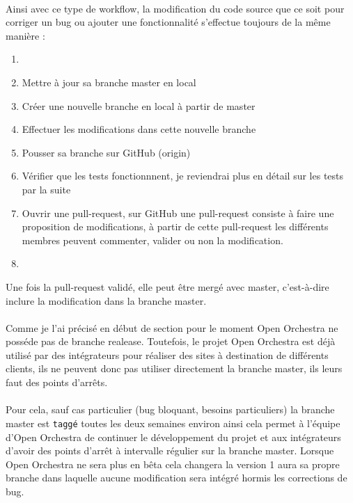 \paragraph{}
Ainsi avec ce type de workflow, la modification du code source que ce soit pour corriger un bug ou ajouter une fonctionnalité s'effectue toujours de la même manière : 
\begin{enumerate}
\item[]
\item Mettre à jour sa branche master en local
\item Créer une nouvelle branche en local à partir de master
\item Effectuer les modifications dans cette nouvelle branche
\item Pousser sa branche sur GitHub (origin)
\item Vérifier que les tests fonctionnnent, je reviendrai plus en détail sur les tests par la suite
\item Ouvrir une pull-request, sur GitHub une pull-request consiste à faire une proposition de modifications, à partir de cette pull-request les différents membres peuvent commenter, valider ou non la modification.
         \item[]
\end{enumerate}

Une fois la pull-request validé, elle peut être mergé avec master, c'est-à-dire inclure la modification dans la branche master.
\paragraph{}
Comme je l'ai précisé en début de section pour le moment Open Orchestra ne posséde pas de branche realease. Toutefois, le projet Open Orchestra est déjà utilisé par des intégrateurs pour réaliser des sites à destination de différents clients, ils ne peuvent donc pas utiliser directement la branche master, ils leurs faut des points d'arrêts. 

\paragraph{}
Pour cela, sauf cas particulier (bug bloquant, besoins particuliers) la branche master est \verb?taggé? toutes les deux semaines environ ainsi cela permet à l'équipe d'Open Orchestra de continuer le développement  du projet et aux intégrateurs d'avoir des points d'arrêt à intervalle régulier sur la branche master.  Lorsque Open Orchestra ne sera plus en bêta cela changera la version 1 aura sa propre branche dans laquelle aucune modification sera intégré hormis les corrections de bug.

